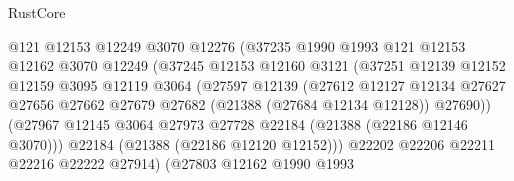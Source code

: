 \begin{lexlean}{RustCore}
\begin{coremodule}
                                  @121
                                  @12153
                                  @12249
                                  @3070
                                  @12276
                                  (@37235
                                    @1990
                                    @1993
                                    @121
                                    @12153
                                    @12162
                                    @3070
                                    @12249
                                    (@37245
                                      @12153
                                      @12160
                                      @3121
                                      (@37251
                                        @12139
                                        @12152
                                        @12159
                                        @3095
                                        @12119
                                        @3064
                                        (@27597
                                          @12139
                                          (@27612
                                            @12127
                                            @12134
                                            @27627
                                            @27656
                                            @27662
                                            @27679
                                            @27682
                                            (@21388 (@27684 @12134 @12128))
                                            @27690))
                                        (@27967
                                          @12145
                                          @3064
                                          @27973
                                          @27728
                                          @22184
                                          (@21388 (@22186 @12146 @3070)))
                                        @22184
                                        (@21388 (@22186 @12120 @12152)))
                                      @22202
                                      @22206
                                      @22211
                                      @22216
                                      @22222
                                      @27914)
                                    (@27803
                                      @12162
                                      @1990
                                      @1993

\end{coremodule}
\end{lexlean}
